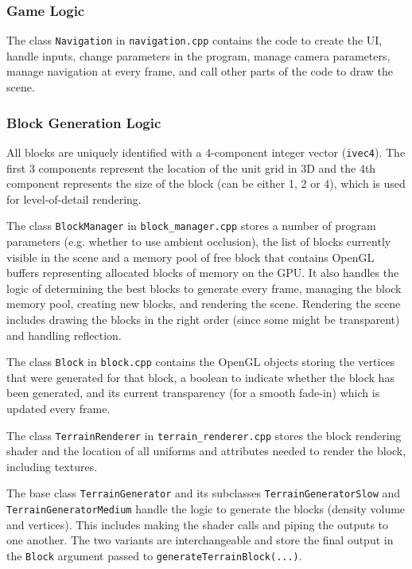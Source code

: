 \documentclass {article}
\begin{document}
\subsubsection{Game Logic}

The class \texttt{Navigation} in \texttt{navigation.cpp} contains the code to create the UI, handle inputs, change parameters in the program, manage camera parameters, manage navigation at every frame, and call other parts of the code to draw the scene.

\subsubsection{Block Generation Logic}

All blocks are uniquely identified with a 4-component integer vector (\texttt{ivec4}). The first 3 components represent the location of the unit grid in 3D and the 4th component represents the size of the block (can be either 1, 2 or 4), which is used for level-of-detail rendering.

The class \texttt{BlockManager} in \texttt{block\_manager.cpp} stores a number of program parameters (e.g. whether to use ambient occlusion), the list of blocks currently visible in the scene and a memory pool of free block that contains OpenGL buffers representing allocated blocks of memory on the GPU. It also handles the logic of determining the best blocks to generate every frame, managing the block memory pool, creating new blocks, and rendering the scene. Rendering the scene includes drawing the blocks in the right order (since some might be transparent) and handling reflection.

The class \texttt{Block} in \texttt{block.cpp} contains the OpenGL objects storing the vertices that were generated for that block, a boolean to indicate whether the block has been generated, and its current transparency (for a smooth fade-in) which is updated every frame.

The class \texttt{TerrainRenderer} in \texttt{terrain\_renderer.cpp} stores the block rendering shader and the location of all uniforms and attributes needed to render the block, including textures.

The base class \texttt{TerrainGenerator} and its subclasses \texttt{TerrainGeneratorSlow} and \texttt{TerrainGeneratorMedium} handle the logic to generate the blocks (density volume and vertices).  This includes making the shader calls and piping the outputs to one another. The two variants are interchangeable and store the final output in the \texttt{Block} argument passed to \texttt{generateTerrainBlock(...)}.
\end{document}
